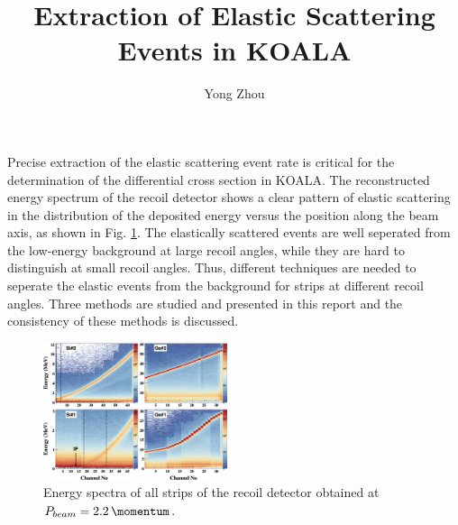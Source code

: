 \documentclass[fleqn,twocolumn,a4paper]{ikpar}
\begin{document}
\parindent=0pt
\frenchspacing

\title{{\bf
    Extraction of Elastic Scattering Events in KOALA
}}
\author{Yong Zhou
}

\maketitle

Precise extraction of the elastic scattering event rate is critical for the
determination of the differential cross section in KOALA.
The reconstructed energy spectrum of the recoil detector shows a clear pattern of
elastic scattering in the distribution of the deposited energy versus the position along the beam axis, as shown in Fig. \ref{fig:energy_vs_strips}.
The elastically scattered events are well seperated from the low-energy background at large
recoil angles, while they are hard to distinguish at small recoil angles.
Thus, different techniques are needed to seperate the elastic events from the
background for strips at different recoil angles.
Three methods are studied and presented in this report and the consistency of these methods is discussed.
\begin{figure}[!htb]
	\includegraphics[width=0.48\textwidth]{./energy_vs_strips.png}
  \caption{Energy spectra of all strips of the recoil detector obtained at
    $P_{beam} = \SI{2.2}{\momentum}$.}
  \label{fig:energy_vs_strips}
\end{figure}

\par
\medskip
\end{document}

